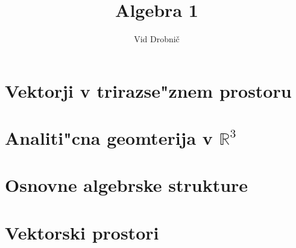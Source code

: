 \documentclass[a4paper, 12pt]{article}
\title{Algebra 1}
\author{Vid Drobnič}
\date{}
\begin{document}
	\maketitle
	\thispagestyle{empty}
	\pagebreak
	\setcounter{page}{1}
	
	\tableofcontents
	\pagebreak
	
	\section{Vektorji v trirazse"znem prostoru}
	
	
	\section{Analiti"cna geomterija v $\mathbb{R}^3$}
	
	
	\section{Osnovne algebrske strukture}
	
	
	\section{Vektorski prostori}
	
\end{document}
